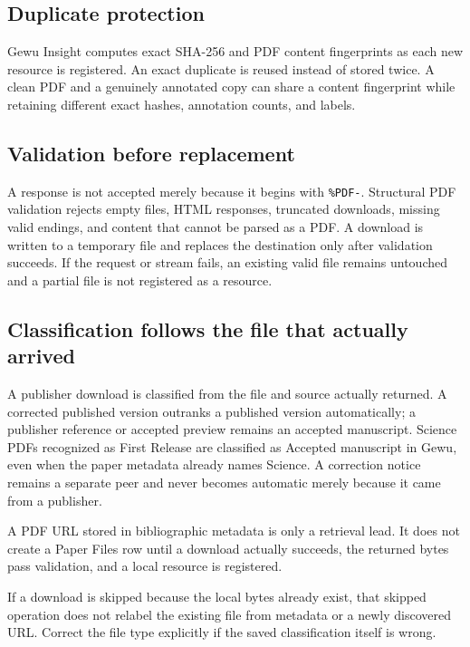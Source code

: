 \documentclass[10pt,letterpaper,oneside]{scrreprt}
\begin{document}
\subsection{Duplicate protection}\label{duplicate-protection}

Gewu Insight computes exact SHA-256 and PDF content fingerprints as each new resource is registered. An exact duplicate is reused instead of stored twice. A clean PDF and a genuinely annotated copy can share a content fingerprint while retaining different exact hashes, annotation counts, and labels.

\subsection{Validation before replacement}\label{validation-before-replacement}

A response is not accepted merely because it begins with \texttt{\%PDF-}. Structural PDF validation rejects empty files, HTML responses, truncated downloads, missing valid endings, and content that cannot be parsed as a PDF. A download is written to a temporary file and replaces the destination only after validation succeeds. If the request or stream fails, an existing valid file remains untouched and a partial file is not registered as a resource.

\subsection{Classification follows the file that actually arrived}\label{classification-follows-the-file-that-actually-arrived}

A publisher download is classified from the file and source actually returned. A corrected published version outranks a published version automatically; a publisher reference or accepted preview remains an accepted manuscript. Science PDFs recognized as First Release are classified as Accepted manuscript in Gewu, even when the paper metadata already names Science. A correction notice remains a separate peer and never becomes automatic merely because it came from a publisher.

A PDF URL stored in bibliographic metadata is only a retrieval lead. It does not create a Paper Files row until a download actually succeeds, the returned bytes pass validation, and a local resource is registered.

If a download is skipped because the local bytes already exist, that skipped operation does not relabel the existing file from metadata or a newly discovered URL. Correct the file type explicitly if the saved classification itself is wrong.
\end{document}
